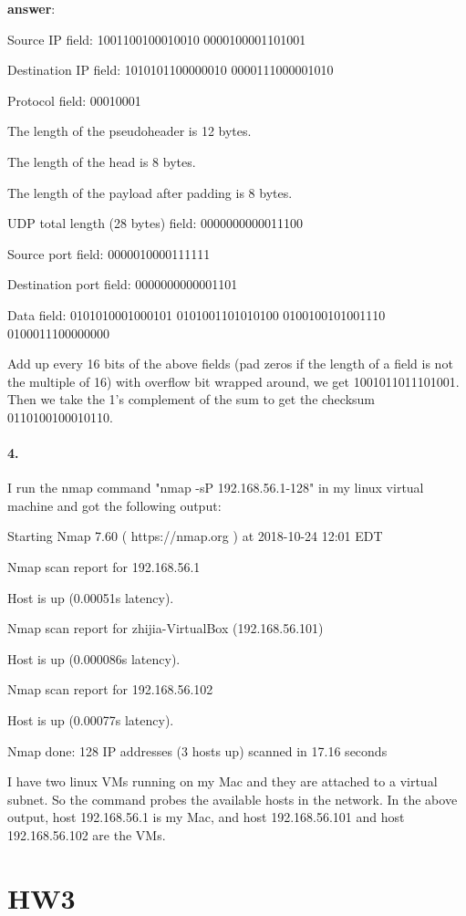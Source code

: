 \documentclass{article}
\begin{document}
\textbf{answer}: 

Source IP field: 1001100100010010 0000100001101001

Destination IP field: 1010101100000010 0000111000001010

Protocol field: 00010001

The length of the pseudoheader is 12 bytes.

The length of the head is 8 bytes.

The length of the payload after padding is 8 bytes.

UDP total length (28 bytes) field: 0000000000011100

Source port field: 0000010000111111

Destination port field: 0000000000001101

Data field: 0101010001000101 0101001101010100 0100100101001110 0100011100000000

Add up every 16 bits of the above fields (pad zeros if the length of a field is not the multiple of 16) with overflow bit wrapped around, we get 1001011011101001. Then we take the 1's complement of the sum to get the checksum 0110100100010110.

\paragraph{4.} I run the nmap command "nmap -sP 192.168.56.1-128" in my linux virtual machine and got the following output:

Starting Nmap 7.60 ( https://nmap.org ) at 2018-10-24 12:01 EDT

Nmap scan report for 192.168.56.1

Host is up (0.00051s latency).

Nmap scan report for zhijia-VirtualBox (192.168.56.101)

Host is up (0.000086s latency).

Nmap scan report for 192.168.56.102

Host is up (0.00077s latency).

Nmap done: 128 IP addresses (3 hosts up) scanned in 17.16 seconds

I have two linux VMs running on my Mac and they are attached to a virtual subnet. So the command probes the available hosts in the network. In the above output, host 192.168.56.1 is my Mac, and host 192.168.56.101 and host 192.168.56.102 are the VMs.

\section{HW3}
\end{document}
